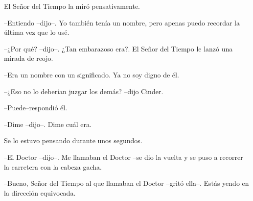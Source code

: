 El Señor del Tiempo la miró pensativamente.

--Entiendo --dijo--. Yo también tenía un nombre, pero apenas puedo recordar la última vez que lo usé.

--¿Por qué? --dijo--. ¿Tan embarazoso era?.
El Señor del Tiempo le lanzó una mirada de reojo.

--Era un nombre con un significado. Ya no soy digno de él.

--¿Eso no lo deberían juzgar los demás? --dijo Cinder.

--Puede--respondió él.

--Dime --dijo--. Dime cuál era.

Se lo estuvo pensando durante unos segundos.

--El Doctor --dijo--. Me llamaban el Doctor --se dio la vuelta y se puso a recorrer la carretera con la cabeza gacha.

--Bueno, Señor del Tiempo al que llamaban el Doctor --gritó ella--. Estás yendo en la dirección equivocada.

\mbox{}

